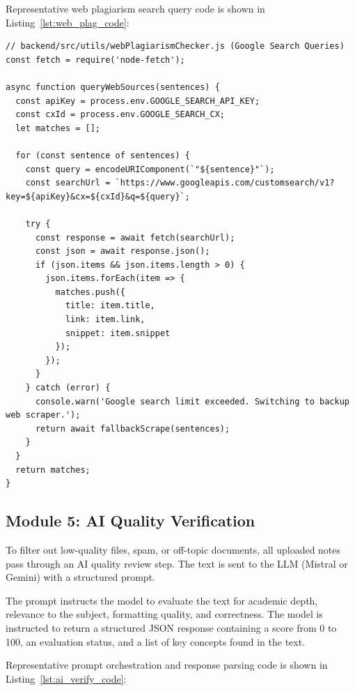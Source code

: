 \documentclass[12,Times new Roman,a4paper]{report}
\begin{document}
Representative web plagiarism search query code is shown in Listing~\ref{lst:web_plag_code}:

\begin{verbatim}
// backend/src/utils/webPlagiarismChecker.js (Google Search Queries)
const fetch = require('node-fetch');

async function queryWebSources(sentences) {
  const apiKey = process.env.GOOGLE_SEARCH_API_KEY;
  const cxId = process.env.GOOGLE_SEARCH_CX;
  let matches = [];

  for (const sentence of sentences) {
    const query = encodeURIComponent(`"${sentence}"`);
    const searchUrl = `https://www.googleapis.com/customsearch/v1?key=${apiKey}&cx=${cxId}&q=${query}`;

    try {
      const response = await fetch(searchUrl);
      const json = await response.json();
      if (json.items && json.items.length > 0) {
        json.items.forEach(item => {
          matches.push({
            title: item.title,
            link: item.link,
            snippet: item.snippet
          });
        });
      }
    } catch (error) {
      console.warn('Google search limit exceeded. Switching to backup web scraper.');
      return await fallbackScrape(sentences);
    }
  }
  return matches;
}
\end{verbatim}
\label{lst:web_plag_code}

\subsection{Module 5: AI Quality Verification}

To filter out low-quality files, spam, or off-topic documents, all uploaded notes pass through an AI quality review step. The text is sent to the LLM (Mistral or Gemini) with a structured prompt. 

The prompt instructs the model to evaluate the text for academic depth, relevance to the subject, formatting quality, and correctness. The model is instructed to return a structured JSON response containing a score from 0 to 100, an evaluation status, and a list of key concepts found in the text.

Representative prompt orchestration and response parsing code is shown in Listing~\ref{lst:ai_verify_code}:
\end{document}
